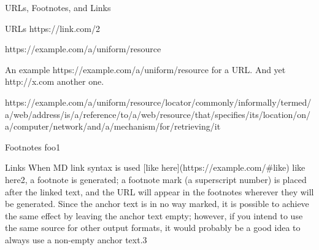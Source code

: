 


\vspace{\myLineheight}\begin{multicols}{2}\raggedcolumns{}

\end{multicols}


{\mktsHTwo{}URLs, Footnotes, and Links\mktsHTwoBEG}%


\vspace{\myLineheight}\begin{multicols}{2}\raggedcolumns{}
{\mktsHThree{}URLs\mktsHThreeBEG}%
{\mktsStyleUrl{}https:\g/\g/\g\allowbreak{}link.com/2}

{\mktsStyleUrl{}https:\g/\g/\g\allowbreak{}example.com\g/\g\allowbreak{}a\g/\g\allowbreak{}uniform\g/\g\allowbreak{}resource}

An example {\mktsStyleUrl{}https:\g/\g/\g\allowbreak{}example.com\g/\g\allowbreak{}a\g/\g\allowbreak{}uniform\g/\g\allowbreak{}resource} for a URL.
And yet {\mktsStyleUrl{}http:\g/\g/\g\allowbreak{}x.com} another one.

{\mktsStyleUrl{}https:\g/\g/\g\allowbreak{}example.com\g/\g\allowbreak{}a\g/\g\allowbreak{}uniform\g/\g\allowbreak{}resource\g/\g\allowbreak{}locator\g/\g\allowbreak{}commonly\g/\g\allowbreak{}informally\g/\g\allowbreak{}termed\g/\g\allowbreak{}a\g/\g\allowbreak{}web\g/\g\allowbreak{}address\g/\g\allowbreak{}is\g/\g\allowbreak{}a\g/\g\allowbreak{}reference\g/\g\allowbreak{}to\g/\g\allowbreak{}a\g/\g\allowbreak{}web\g/\g\allowbreak{}resource\g/\g\allowbreak{}that\g/\g\allowbreak{}specifies\g/\g\allowbreak{}its\g/\g\allowbreak{}location\g/\g\allowbreak{}on\g/\g\allowbreak{}a\g/\g\allowbreak{}computer\g/\g\allowbreak{}network\g/\g\allowbreak{}and\g/\g\allowbreak{}a\g/\g\allowbreak{}mechanism\g/\g\allowbreak{}for\g/\g\allowbreak{}retrieving\g/\g\allowbreak{}it}


{\mktsHThree{}Footnotes\mktsHThreeBEG}%
foo{\mktsEnStyleMarkMain{}1}


{\mktsHThree{}Links\mktsHThreeBEG}%
When MD link syntax is used {\mktsStyleCode{}[like \allowbreak{}here]\allowbreak{}(https://\allowbreak{}example.com/\allowbreak{}\#like)}
like here{\mktsEnStyleMarkMain{}2}, a footnote is generated; a footnote mark
(a superscript number) is placed after the linked text, and the URL will appear in
the footnotes wherever they will be generated. Since the anchor text is in no way
marked, it is possible to achieve the same effect by leaving the anchor text
empty; however, if you intend to use the same source for other output formats,
it would probably be a good idea to always use a non-empty anchor text.{\mktsEnStyleMarkMain{}3}




\end{multicols}

